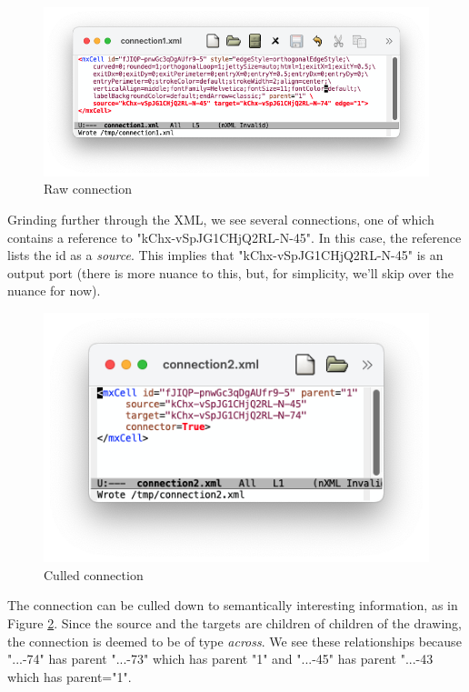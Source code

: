 \documentclass[10pt,anonymous,review]{acmart}
\begin{document}
\begin{figure}
    \includegraphics[trim=2cm 2cm 2cm 1.7cm, clip, scale=0.35]{./media/connection1.png}
    \caption{Raw connection}
    \label{connection}
\end{figure}
Grinding further through the XML, we see several connections, one of which contains a reference to "kChx-vSpJG1CHjQ2RL-N-45". In this case, the reference lists the id as a \emph{source}. This implies that "kChx-vSpJG1CHjQ2RL-N-45" is an output port (there is more nuance to this, but, for simplicity, we'll skip over the nuance for now).


\begin{figure}
    \includegraphics[trim=2cm 2cm 2cm 1.7cm, clip, scale=0.4]{./media/connection2.png}
    \caption{Culled connection}
    \label{connection2}
\end{figure}
The connection can be culled down to semantically interesting information, as in Figure \ref{connection2}.
Since the source and the targets are children of children of the drawing, the connection is deemed to be of type \emph{across}.
We see these relationships because "...-74" has parent "...-73" which has parent "1" and "...-45" has parent "...-43 which has parent="1". 
\end{document}
